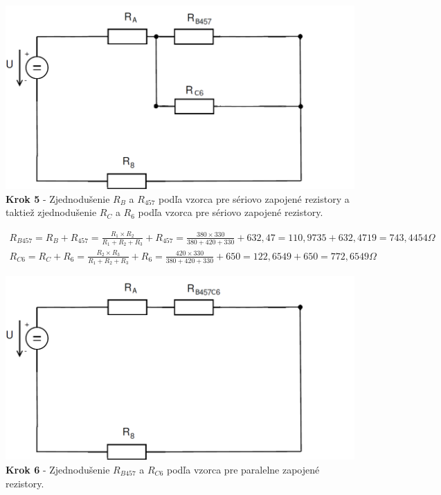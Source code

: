 \begin{center}
\includegraphics[scale=0.5,keepaspectratio]{fig/obr/Pr1_5.png} \\
\textbf{Krok 5} - Zjednodušenie $R_{B}$ a $R_{457}$ podľa vzorca pre sériovo zapojené rezistory a taktiež zjednodušenie $R_{C}$ a $R_{6}$ podľa vzorca pre sériovo zapojené rezistory.
\end{center}
\newpage
\begin{gather*}
R_{B457}=R_{B}+R_{457}=\frac{R_{1} \times R_{2}}{R_{1}+R_{2}+R_{3}}+R_{457}=\frac{380  \times 330}{380+420+330}+632,47=110,9735+632,4719=743,4454\Omega \\
R_{C6}=R_{C}+R_{6}=\frac{R_{2} \times R_{3}}{R_{1}+R_{2}+R_{3}}+R_{6}=\frac{420 \times 330}{380+420+330}+650=122,6549+650=772,6549\Omega 
\end{gather*}

 
\begin{center}
\includegraphics[scale=0.5,keepaspectratio]{fig/obr/Pr1_6.png} \\
\textbf{Krok 6} - Zjednodušenie $R_{B457}$ a $R_{C6}$ podľa vzorca pre paralelne zapojené rezistory.
\end{center}

